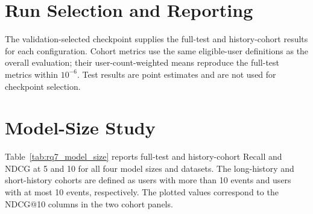 ﻿\documentclass[sigconf,anonymous,review]{acmart}
\begin{document}
\section{Run Selection and Reporting}
\label{app:run_reporting}
The validation-selected checkpoint supplies the full-test and history-cohort results for each configuration. Cohort metrics use the same eligible-user definitions as the overall evaluation; their user-count-weighted means reproduce the full-test metrics within $10^{-6}$. Test results are point estimates and are not used for checkpoint selection.

\section{Model-Size Study}
\label{app:model_size}
Table~\ref{tab:rq7_model_size} reports full-test and history-cohort Recall and NDCG at 5 and 10 for all four model sizes and datasets. The long-history and short-history cohorts are defined as users with more than 10 events and users with at most 10 events, respectively. The plotted values correspond to the NDCG@10 columns in the two cohort panels.
\end{document}
